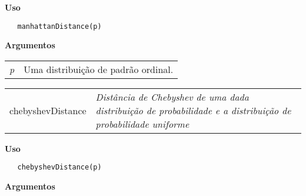 \documentclass[12pt,letterpaper]{article}
\begin{document}
\vspace{-0.5cm}

\hrulefill  

\vspace{0.5cm}

\textbf{Uso}

\begin{lstlisting}
   manhattanDistance(p)
\end{lstlisting}

\vspace{0.5cm}

\textbf{Argumentos}

\begin{table}[!h]
\begin{center}
\begin{tabularx}{\textwidth}{X X}
\hspace{0.5cm} \textit{p} & Uma distribuição de padrão ordinal.\\
\end{tabularx}
\end{center}
\end{table} 

\hrulefill   

\begin{table}[!h]
\begin{center}
\begin{tabularx}{\textwidth}{ X X}
\hspace{0.5cm} chebyshevDistance & \textit{Distância de Chebyshev de uma dada distribuição de probabilidade e a distribuição de probabilidade uniforme}\\
\end{tabularx}
\end{center}
\end{table} 

\vspace{-0.5cm}

\hrulefill  

\vspace{0.5cm}

\textbf{Uso}

\begin{lstlisting}
   chebyshevDistance(p)
\end{lstlisting}

\vspace{0.5cm}

\textbf{Argumentos}
\end{document}
